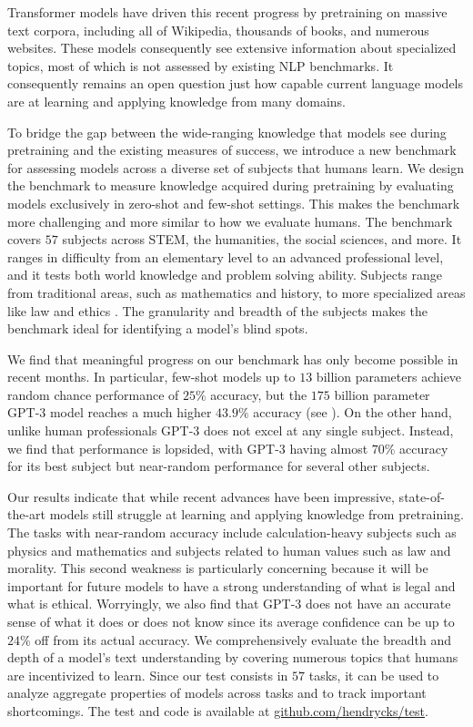 \documentclass{article}
\begin{document}
Transformer models have driven this recent progress by pretraining on massive text corpora, including all of Wikipedia, thousands of books, and numerous websites. These models consequently see extensive information about specialized topics, most of which is not assessed by existing NLP benchmarks. 
It consequently remains an open question just how capable current language models are at learning and applying knowledge from many domains.

To bridge the gap between the wide-ranging knowledge that models see during pretraining and the existing measures of success,
we introduce a new benchmark for assessing models across a diverse set of subjects that humans learn.
We design the benchmark to measure knowledge acquired during pretraining by evaluating models exclusively in zero-shot and few-shot settings. This makes the benchmark more challenging and more similar to how we evaluate humans.
The benchmark covers $57$ subjects across STEM, the humanities, the social sciences, and more. It ranges in difficulty from an elementary level to an advanced professional level, and it tests both world knowledge and problem solving ability.
Subjects range from traditional areas, such as mathematics and history, to more specialized areas like law and ethics \citep{hendrycks2020ethicsdataset}.
The granularity and breadth of the subjects makes the benchmark ideal for identifying a model's blind spots. 

We find that meaningful progress on our benchmark has only become possible in recent months. In particular, few-shot models up to $13$ billion parameters \citep{brown2020gpt3} achieve random chance performance of $25\%$ accuracy, but the $175$ billion parameter GPT-3 model reaches a much higher $43.9\%$ accuracy (see ). 
On the other hand, unlike human professionals GPT-3 does not excel at any single subject.
Instead, we find that performance is lopsided, with GPT-3 having almost $70\%$ accuracy for its best subject but near-random performance for several other subjects.

Our results indicate that while recent advances have been impressive, state-of-the-art models still struggle at learning and applying knowledge from pretraining.
The tasks with near-random accuracy include calculation-heavy subjects such as physics and mathematics and subjects related to human values such as law and morality. 
This second weakness is particularly concerning because it will be important for future models to have a strong understanding of what is legal and what is ethical. Worryingly, we also find that GPT-3 does not have an accurate sense of what it does or does not know since its average confidence can be up to $24\%$ off from its actual accuracy.
We comprehensively evaluate the breadth and depth of a model's text understanding by covering numerous topics that humans are incentivized to learn.
Since our test consists in $57$ tasks, it can be used to analyze aggregate properties of models across tasks and to track important shortcomings.
The test and code is available at \href{https://github.com/hendrycks/test}{github.com/hendrycks/test}. 
\end{document}
